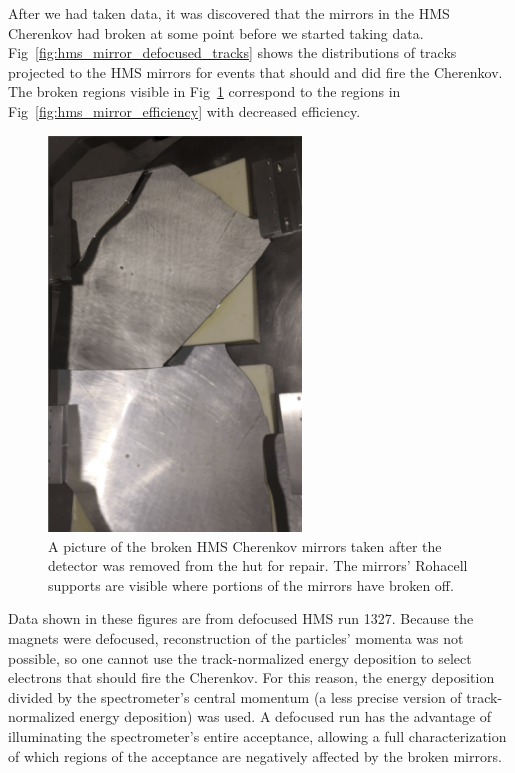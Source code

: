After we had taken data, it was discovered that the mirrors in the HMS
Cherenkov had broken at some point before we started taking data.
Fig~\ref{fig:hms_mirror_defocused_tracks} shows the distributions of tracks
projected to the HMS mirrors for events that should and did fire the Cherenkov.
The broken regions visible in Fig~\ref{fig:hms_mirrors} correspond to the
regions in Fig~\ref{fig:hms_mirror_efficiency} with decreased efficiency.

\begin{figure}[!h]
    \centering
    \includegraphics[width=0.6\textwidth]{chap4/hms_mirrors.png}
    \caption{
            A picture of the broken HMS Cherenkov mirrors taken after the
            detector was removed from the hut for repair.
            The mirrors' Rohacell supports are visible where portions of the
            mirrors have broken off.
            }
    \label{fig:hms_mirrors}
\end{figure}


Data shown in these figures are from defocused HMS run 1327.
Because the magnets were defocused, reconstruction of the
particles' momenta was not possible, so one cannot use the
track-normalized energy deposition to select electrons that should fire the
Cherenkov.
For this reason, the energy deposition divided by the spectrometer's central
momentum (a less precise version of track-normalized energy deposition)
was used.
A defocused run has the advantage of illuminating the spectrometer's entire
acceptance, allowing a full characterization of which regions of the acceptance
are negatively affected by the broken mirrors.

